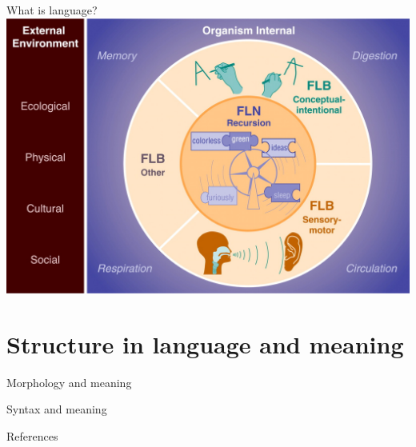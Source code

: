 \documentclass{beamer}
\begin{document}
\begin{frame}{What is language?}
	\includegraphics[scale=0.25]{FLN.jpg}
	\nocite{hauser2002faculty}
\end{frame}


\section{Structure in language and meaning}

\begin{frame}{Morphology and meaning}

\end{frame}

\begin{frame}{Syntax and meaning}

\end{frame}



\begin{frame}{References}


\end{frame}
\end{document}
